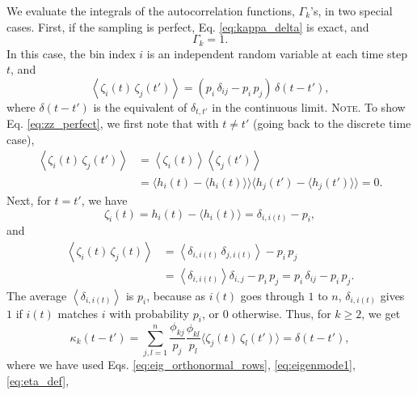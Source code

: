\documentclass[reprint, floatfix]{revtex4-1}
\newcommand{\note}[1]{{\color{DarkGreen}\footnotesize \textsc{Note.} #1}}
\begin{document}
We evaluate the integrals of the autocorrelation functions,
$\Gamma_k$'s,
in two special cases.
%
First, if the sampling is perfect,
Eq. \eqref{eq:kappa_delta} is exact, and
%
\begin{equation}
  \Gamma_k = 1.
  \label{eq:Gamma_perfect}
\end{equation}
%
In this case,
the bin index $i$ is an independent random variable
at each time step $t$, and
%
\begin{equation}
  \left\langle
    \zeta_i(t) \, \zeta_j(t')
  \right\rangle
  =
  \left( p_i \, \delta_{ij} - p_i \, p_j \right) \, \delta(t - t'),
  \label{eq:zz_perfect}
\end{equation}
%
where $\delta(t - t')$ is the equivalent of $\delta_{t, t'}$
in the continuous limit.
%
\note{To show Eq. \eqref{eq:zz_perfect}, we first note that
  with $t \ne t'$ (going back to the discrete time case),
  $$
  \begin{aligned}
  \left\langle
    \zeta_i(t) \, \zeta_j(t')
  \right\rangle
  &=
  \left\langle
    \zeta_i(t)
  \right\rangle
  \left\langle
    \zeta_j(t')
  \right\rangle
  \\
  &=
  \bigl\langle h_i(t)  - \langle h_i(t)  \rangle \bigr\rangle
  \bigl\langle h_j(t') - \langle h_j(t') \rangle \bigr\rangle
  =
  0.
  \end{aligned}
  $$
  Next, for $t = t'$, we have
  $$
  \zeta_i(t)
  = h_i(t) - \langle h_i(t) \rangle
  = \delta_{i, i(t)} - p_i,
  $$
  and
  $$
  \begin{aligned}
  \left\langle
    \zeta_i(t) \, \zeta_j(t)
  \right\rangle
  &=
  \left\langle
    \delta_{i, i(t)} \, \delta_{j, i(t)}
  \right\rangle
  -
  p_i \, p_j
  \\
  &=
  \left\langle
    \delta_{i, i(t)}
  \right\rangle
  \delta_{i, j}
  -
  p_i \, p_j
  =
  p_i \, \delta_{ij}
  - p_i \, p_j.
  \end{aligned}
  $$
  The average
  $\left\langle \delta_{i, i(t)} \right\rangle$ is $p_i$,
  because as $i(t)$ goes through $1$ to $n$,
  $\delta_{i, i(t)}$ gives $1$
  if $i(t)$ matches $i$ with probability $p_i$,
  or $0$ otherwise.
}
%
Thus,
for $k \ge 2$, we get
%
\begin{equation}
  \kappa_k(t - t')
  =
  \sum_{j,l = 1}^n
  \frac{ \phi_{kj} } { p_j }
  \frac{ \phi_{kl} } { p_l }
  \langle \zeta_j(t) \, \zeta_l(t') \rangle
  = \delta(t - t'),
  \label{eq:kappa_perfect}
\end{equation}
%
where we have used
Eqs. \eqref{eq:eig_orthonormal_rows},
\eqref{eq:eigenmode1},
\eqref{eq:eta_def},
\end{document}
